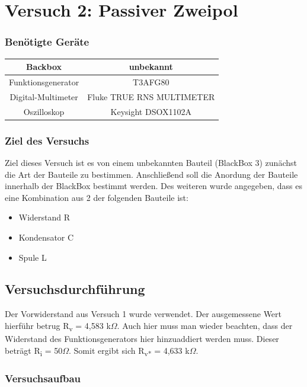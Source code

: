 \chapter{Versuch 2: Passiver Zweipol}
\subsection*{Benötigte Geräte}

\begin{tabular}[h]{c|c}
	Backbox & unbekannt \\
    \hline
    Funktionsgenerator & T3AFG80\\
    \hline
    Digital-Multimeter & Fluke TRUE RNS MULTIMETER\\
    \hline
    Oszilloskop & Keysight DSOX1102A
    \label{tab:Versuch 2: Geräte}
\end{tabular}

\subsection*{Ziel des Versuchs}
Ziel dieses Versuch ist es von einem unbekannten Bauteil (BlackBox 3) zunächst
die Art der Bauteile zu bestimmen. Anschließend soll die Anordung der Bauteile
innerhalb der BlackBox bestimmt werden. Des weiteren wurde angegeben, dass es eine
Kombination aus 2 der folgenden Bauteile ist:
\begin{itemize}
    \item Widerstand R
    \item Kondensator C
    \item Spule L
\end{itemize}

\section{Versuchsdurchführung}
Der Vorwiderstand aus Versuch 1 wurde verwendet. Der ausgemessene Wert hierführ
betrug R\textsubscript{v} = 4,583 k$\Omega$. Auch hier muss man wieder beachten, 
dass der Widerstand des Funktionsgenerators hier hinzuaddiert werden muss. 
Dieser beträgt R\textsubscript{i} = 50$\Omega$. Somit ergibt sich 
R\textsubscript{v*} = 4,633 k$\Omega$.

\subsection*{Versuchsaufbau}

